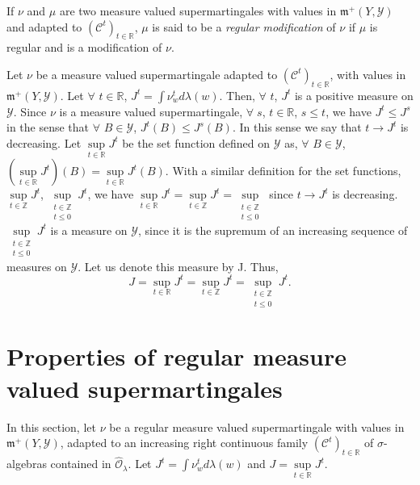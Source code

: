 \begin{defn}\label{part2:chap4:def71}
If $\nu$ and $\mu$ are two measure valued supermartingales with values
in $\mathfrak{m}^+ (Y, \mathscr{Y})$ and adapted to
$(\mathscr{C}^t)_{t \in \mathbb{R}}$, $\mu$ is said to be a {\em
  regular modification} of $\nu$ if $\mu$ is regular and is a
modification of $\nu$. 
\end{defn}

Let $\nu$ be a measure valued supermartingale adapted to
$(\mathscr{C}^t)_{t \in \mathbb{R}}$, with values in $\mathfrak{m}^+
(Y, \mathscr{Y})$. Let $\forall$ $t \in\mathbb{R}$, $J^t = \int
\nu^t_w d\lambda(w)$. Then, $\forall$ $t$, $J^t$ is a positive measure
on $\mathscr{Y}$. Since $\nu$ is a measure valued supermartingale,
$\forall \; s$, $t \in \mathbb{R}$, $s \leq t$, we have $J^t \leq J^s$
in the sense that $\forall $ $B \in \mathscr{Y}$, $J^t(B) \leq
J^s(B)$. In this sense we say that $t \to J^t$ is decreasing. Let
$\sup\limits_{t \in \mathbb{R}} J^t$ be the set function defined on
$\mathscr{Y}$ as, $\forall$ $B \in \mathscr{Y}$, $(\sup\limits_{t \in
  \mathbb{R}} J^t) (B) = \sup\limits_{t \in \mathbb{R}} J^t (B)$. With
a similar definition for the set functions, $\sup\limits_{t \in
  \mathbb{Z}} J^t$, $\sup\limits_{\substack{t \in \mathbb{Z}\\t \leq
    0}} J^t$, we have $\sup\limits_{t \in \mathbb{R}} J^t =
\sup\limits_{t \in \mathbb{Z}} J^t = \sup\limits_{\substack{t \in
    \mathbb{Z}\\t \leq 0}}$ since $t \to J^t$ is
decreasing. $\sup\limits_{\substack{t \in \mathbb{Z}\\ t \leq 0}} J^t$
is a measure on $\mathscr{Y}$, since it is the supremum of an
increasing sequence of measures on $\mathscr{Y}$. Let us denote this
measure by J. Thus,
$$
J = \sup\limits_{t \in\mathbb{R}} J^t = \sup\limits_{t \in \mathbb{Z}}
J^t = \sup\limits_{\substack{t \in \mathbb{Z}\\t \leq 0}} J^t. 
$$

\section[Properties of regular measure valued
  supermartingales]{Properties of regular measure valued\hfil\break
  supermartingales}\label{part2:chap4:sec3} 

In this section, let $\nu$ be a regular measure valued supermartingale
with values in $\mathfrak{m}^+ (Y, \mathscr{Y})$, adapted to an
increasing right continuous family $(\mathscr{C}^t)_{t \in
  \mathbb{R}}$ of $\sigma$-algebras contained in
$\hat{\mathscr{O}}_\lambda$. Let $J^t = \int \nu^t_w d\lambda(w)$ and
$J = \sup\limits_{t \in \mathbb{R}} J^t$.

